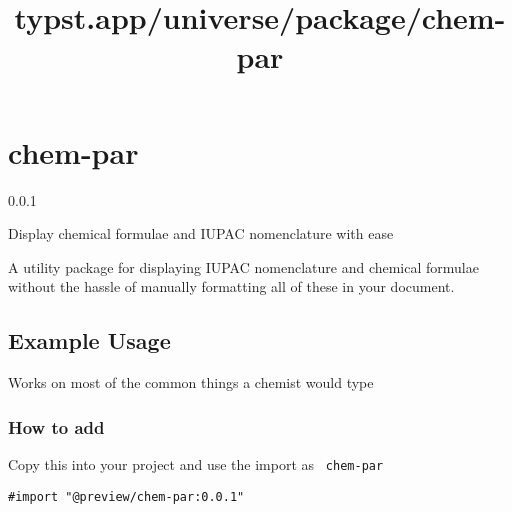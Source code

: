 \title{typst.app/universe/package/chem-par}

\label{banner}
\section{chem-par}\label{chem-par}

{ 0.0.1 }

Display chemical formulae and IUPAC nomenclature with ease

\label{readme}
A utility package for displaying IUPAC nomenclature and chemical
formulae without the hassle of manually formatting all of these in your
document.

\subsection{Example Usage}\label{example-usage}

\begin{Shaded}
\begin{Highlighting}[]


\end{Highlighting}
\end{Shaded}


Works on most of the common things a chemist would type


\subsubsection{How to add}\label{how-to-add}

Copy this into your project and use the import as \texttt{\ chem-par\ }

\begin{verbatim}
#import "@preview/chem-par:0.0.1"
\end{verbatim}

